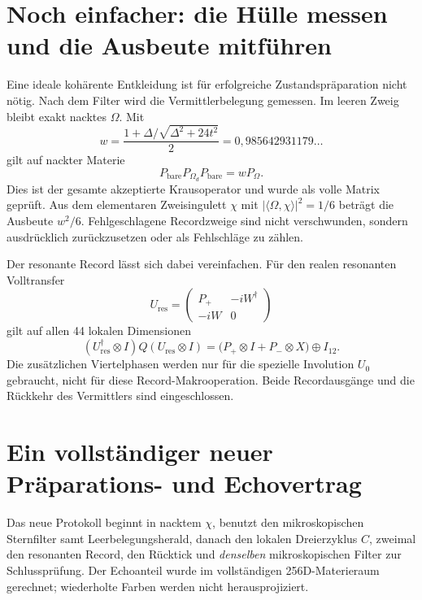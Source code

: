\section{Noch einfacher: die Hülle messen und die Ausbeute mitführen}
Eine ideale kohärente Entkleidung ist für erfolgreiche Zustandspräparation nicht nötig. Nach dem Filter wird die Vermittlerbelegung gemessen. Im leeren Zweig bleibt exakt nacktes $\Omega$. Mit
\begin{equation}
w=\frac{1+\Delta/\sqrt{\Delta^2+24t^2}}2=0{,}985642931179\ldots
\end{equation}
gilt auf nackter Materie
\begin{equation}\boxed{
P_{\mathrm{bare}}P_{\Omega_d}P_{\mathrm{bare}}=wP_\Omega.}
\end{equation}
Dies ist der gesamte akzeptierte Krausoperator und wurde als volle Matrix geprüft. Aus dem elementaren Zweisingulett $\chi$ mit $|\langle\Omega,\chi\rangle|^2=1/6$ beträgt die Ausbeute $w^2/6$. Fehlgeschlagene Recordzweige sind nicht verschwunden, sondern ausdrücklich zurückzusetzen oder als Fehlschläge zu zählen.

Der resonante Record lässt sich dabei vereinfachen. Für den realen resonanten Volltransfer
\begin{equation}
U_{\mathrm{res}}=\begin{pmatrix}P_+&-iW^\dagger\\-iW&0\end{pmatrix}
\end{equation}
gilt auf allen 44 lokalen Dimensionen
\begin{equation}
(U_{\mathrm{res}}^\dagger\otimes I)Q(U_{\mathrm{res}}\otimes I)
=\bigl(P_+\otimes I+P_-\otimes X\bigr)\oplus I_{12}.
\end{equation}
Die zusätzlichen Viertelphasen werden nur für die spezielle Involution $U_0$ gebraucht, nicht für diese Record-Makrooperation. Beide Recordausgänge und die Rückkehr des Vermittlers sind eingeschlossen.

\section{Ein vollständiger neuer Präparations- und Echovertrag}
Das neue Protokoll beginnt in nacktem $\chi$, benutzt den mikroskopischen Sternfilter samt Leerbelegungsherald, danach den lokalen Dreierzyklus $C$, zweimal den resonanten Record, den Rücktick und \emph{denselben} mikroskopischen Filter zur Schlussprüfung. Der Echoanteil wurde im vollständigen 256D-Materieraum gerechnet; wiederholte Farben werden nicht herausprojiziert.

